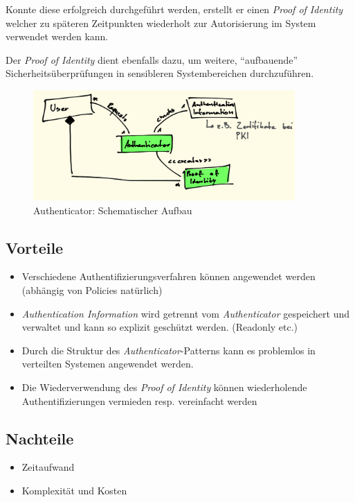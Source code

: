Konnte diese erfolgreich durchgeführt werden, erstellt er einen \emph{Proof of Identity} welcher zu späteren Zeitpunkten wiederholt zur Autorisierung im System verwendet werden kann.

Der \emph{Proof of Identity} dient ebenfalls dazu, um weitere, ``aufbauende'' Sicherheitsüberprüfungen in sensibleren Systembereichen durchzuführen.

\begin{figure}[H]
	\centering
	\includegraphics[width=10cm]{content/security/operating-system-access-control/images/authenticator.png}
	\caption{Authenticator: Schematischer Aufbau}
\end{figure}

\subsection*{Vorteile}
\begin{itemize}
	\item Verschiedene Authentifizierungsverfahren können angewendet werden (abhängig von Policies natürlich)
	\item \emph{Authentication Information} wird getrennt vom \emph{Authenticator} gespeichert und verwaltet und kann so explizit geschützt werden. (Readonly etc.)
	\item Durch die Struktur des \emph{Authenticator}-Patterns kann es problemlos in verteilten Systemen angewendet werden.
	\item Die Wiederverwendung des \emph{Proof of Identity} können wiederholende Authentifizierungen vermieden resp. vereinfacht werden
\end{itemize}

\subsection*{Nachteile}
\begin{itemize}
	\item Zeitaufwand
	\item Komplexität und Kosten
\end{itemize}

